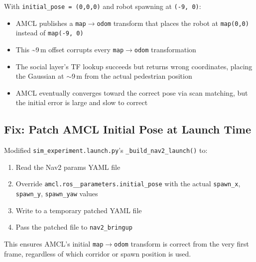 \documentclass[11pt]{article}
\newcommand{\logentry}[1]{\subsection*{#1}}
\begin{document}
With \texttt{initial\_pose = (0,0,0)} and robot spawning at \texttt{(-9, 0)}:
\begin{itemize}
  \item AMCL publishes a \texttt{map$\to$odom} transform that places the robot
    at \texttt{map(0,0)} instead of \texttt{map(-9, 0)}
  \item This \textasciitilde9\,m offset corrupts every \texttt{map$\to$odom}
    transformation
  \item The social layer's TF lookup succeeds but returns wrong coordinates,
    placing the Gaussian at $\sim$9\,m from the actual pedestrian position
  \item AMCL eventually converges toward the correct pose via scan matching,
    but the initial error is large and slow to correct
\end{itemize}

\logentry{Fix: Patch AMCL Initial Pose at Launch Time}
Modified \texttt{sim\_experiment.launch.py}'s \texttt{\_build\_nav2\_launch()}
to:
\begin{enumerate}
  \item Read the Nav2 params YAML file
  \item Override \texttt{amcl.ros\_\_parameters.initial\_pose} with the actual
    \texttt{spawn\_x}, \texttt{spawn\_y}, \texttt{spawn\_yaw} values
  \item Write to a temporary patched YAML file
  \item Pass the patched file to \texttt{nav2\_bringup}
\end{enumerate}

This ensures AMCL's initial \texttt{map$\to$odom} transform is correct from
the very first frame, regardless of which corridor or spawn position is used.
\end{document}
